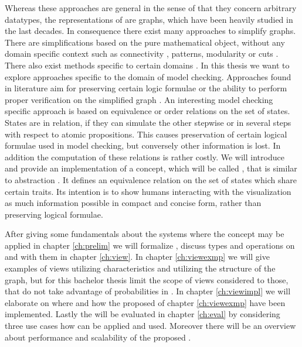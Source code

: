 \documentclass[preview]{standalone}
\begin{document}
Whereas these approaches are general in the sense of that they concern arbitrary datatypes, the representations of \mdpsN are graphs, which have been heavily studied in the last decades. In consequence there exist many approaches to simplify graphs. There are simplifications based on the pure mathematical object, without any domain specific context such as connectivity \cite{Zhou2010}, patterns\cite{Soldano2014}, modularity \cite{Arenas2007} or cuts \cite{Goerke2009,Fung2011}. There also exist methods specific to certain domains \cite{Ruan2011,Li2022,Yaw2019}. In this thesis we want to explore approaches specific to the domain of model checking. Approaches found in literature aim for preserving certain logic formulae or the ability to perform proper verification on the simplified graph \cite{Rensink2012,Bonchi2013,Boneva2007}. An interesting model checking specific approach is based on equivalence or order relations on the set of states. States are in relation, if they can simulate the other stepwise or in several steps with respect to atomic propositions. This causes preservation of certain logical formulae used in model checking, but conversely other information is lost. In addition the computation of these relations is rather costly. We will introduce and provide an implementation of a concept, which will be called \viewN, that is similar to abstraction \cite[pp. 499]{Baier2008}. It defines an equivalence relation on the set of states which share certain traits. Its intention is to show humans interacting with the visualization as much information possible in compact and concise form, rather than preserving logical formulae.

After giving some fundamentals about the systems where the concept \viewN may be applied in chapter \ref{ch:prelim} we will formalize \viewsN, discuss types and operations on and with them in chapter \ref{ch:view}. In chapter \ref{ch:viewexmp} we will give examples of views utilizing \chgphN characteristics and \viewsN utilizing the structure of the \chgphN graph, but for this bachelor thesis limit the scope of views considered to those, that do not take advantage of probabilities in \chgphsN. In chapter \ref{ch:viewimpl} we will elaborate on where and how the proposed \viewsN of chapter \ref{ch:viewexmp} have been implemented. Lastly the \viewsN will be evaluated in chapter \ref{ch:eval} by considering three use cases how \viewsN can be applied and used. Moreover there will be an overview about performance and scalability of the proposed \viewsN. 
\end{document}
